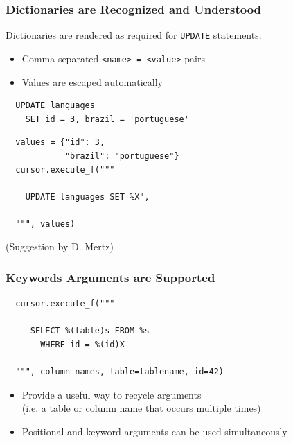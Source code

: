\documentclass{beamer}
\begin{document}
\begin{frame}[fragile]
  \frametitle{Dictionaries are Recognized and Understood}

  Dictionaries are rendered as required for \texttt{UPDATE} statements:
  \begin{itemize}
  \item Comma-separated \texttt{<name> = <value>} pairs
  \item Values are escaped automatically
  \end{itemize}

\begin{verbatim}
  UPDATE languages
    SET id = 3, brazil = 'portuguese'
\end{verbatim}
\vfill

\begin{verbatim}
  values = {"id": 3,
            "brazil": "portuguese"}
  cursor.execute_f("""

    UPDATE languages SET %X",

  """, values)
\end{verbatim}

\vfill

(Suggestion by D. Mertz)

\end{frame}



\begin{frame}[fragile]
  \frametitle{Keywords Arguments are Supported}

\begin{verbatim}
  cursor.execute_f("""

     SELECT %(table)s FROM %s
       WHERE id = %(id)X

  """, column_names, table=tablename, id=42)
\end{verbatim}

\begin{itemize}
\item Provide a useful way to recycle arguments \\
(i.e. a table or column name that occurs multiple times)

\item Positional and keyword arguments can be used simultaneously
\end{itemize}

\end{frame}
\end{document}
